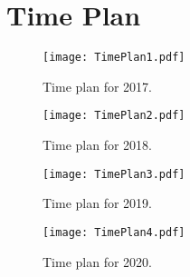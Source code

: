 \chapter{Time Plan}
\label{app:timePlan}




\begin{figure}[h]
\centering
\texttt{[image: TimePlan1.pdf]}
\caption{Time plan for 2017.}
\label{}
\end{figure}

\begin{sidewaysfigure}
\centering
\texttt{[image: TimePlan2.pdf]}
\caption{Time plan for 2018.}
\label{}
\end{sidewaysfigure}

\begin{sidewaysfigure}
\centering
\texttt{[image: TimePlan3.pdf]}
\caption{Time plan for 2019.}
\label{}
\end{sidewaysfigure}

\begin{sidewaysfigure}
\centering
\texttt{[image: TimePlan4.pdf]}
\caption{Time plan for 2020.}
\label{}
\end{sidewaysfigure}